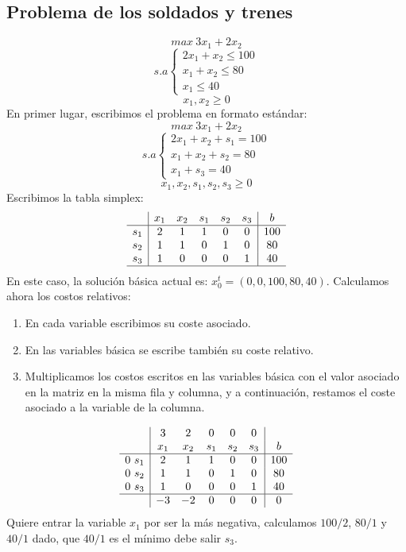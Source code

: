 \documentclass[11pt,fleqn]{book} %
\begin{document}
\subsection{Problema de los soldados y trenes}
$$ max ~ 3x_1+2x_2 $$
$$ s.a \left\{
\begin{array}{c}
2x_1+x_2 \leq 100 \\
x_1+x_2 \leq 80 \\
x_1 \leq 40
\end{array}
\right.
$$
$$ x_1, x_2 \geq 0$$
En primer lugar, escribimos el problema en formato estándar:
$$ max ~ 3x_1+2x_2 $$
$$ s.a \left\{
\begin{array}{c}
2x_1+x_2 + s_1 = 100 \\
x_1+x_2 + s_2 =  80 \\
x_1 + s_3 =  40
\end{array}
\right.
$$
$$ x_1, x_2, s_1, s_2, s_3 \geq 0$$
Escribimos la tabla simplex:
$$
\begin{array}{c|ccccc|c}
& x_1 & x_2 & s_1 & s_2 & s_3 & b \\ \hline
s_1 & 2 & 1 & 1 & 0 & 0 & 100 \\
s_2 & 1 & 1 & 0 & 1 & 0 & 80 \\
s_3 & 1 & 0 & 0 & 0 & 1 & 40 \\ \hline
\end{array}
$$
En este caso, la solución básica actual es: $x_0^t=(0, 0, 100, 80, 40)$. \newpage
Calculamos ahora los costos relativos:
\begin{enumerate}
	\item En cada variable escribimos su coste asociado.
	\item En las variables básica se escribe también su coste relativo.
	\item Multiplicamos los costos escritos en las variables básica con el valor asociado en la matriz en la misma fila y columna, y a continuación, restamos el coste asociado a la variable de la columna.
\end{enumerate}
$$
\begin{array}{c|ccccc|c}
& 3 & 2 & 0 & 0 & 0 & \\
& x_1 & x_2 & s_1 & s_2 & s_3 & b \\ \hline
0 ~ s_1 & 2 & 1 & 1 & 0 & 0 & 100 \\
0 ~s_2 & 1 & 1 & 0 & 1 & 0 & 80 \\
0 ~ s_3 & 1 & 0 & 0 & 0 & 1 & 40 \\ \hline 
& -3 & -2 & 0 & 0 & 0 & 0
\end{array}
$$
Quiere entrar la variable $x_1$ por ser la más negativa, calculamos $100/2$, $80/1$ y $40/1$ dado, que $40/1$ es el mínimo debe salir $s_3$. \\
\end{document}
